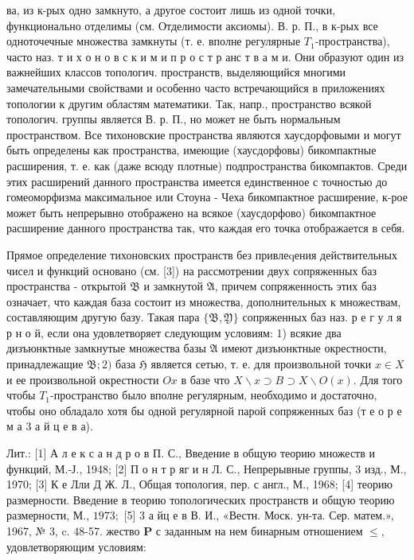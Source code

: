 \documentclass[10pt]{article}
\begin{document}
ва, из к-рых одно замкнуто, а другое состоит лишь из одной точки, функционально отделимы (см. Отделимости аксиомы). В. р. П., в к-рых все одноточечные множества замкнуты (т. е. вполне регулярные $T_{1}$-пространства), часто наз. т и х о н о в с к и м и п р о с т р анс т в а м и. Они образуют один из важнейших классов топологич. пространств, выделяющийся многими замечательными свойствами и особенно часто встречающийся в приложениях топологии к другим областям математики. Так, напр., пространство всякой топологич. группы является В. р. П., но может не быть нормальным пространством. Все тихоновские пространства являются хаусдорфовыми и могут быть определены как пространства, имеющие (хаусдорфовы) бикомпактные расширения, т. е. как (даже всюду плотные) подпространства бикомпактов. Среди этих расширений данного пространства имеется единственное с точностью до гомеоморфизма максимальное или Стоуна - Чеха бикомпактное расширение, к-рое может быть непрерывно отображено на всякое (хаусдорфово) бикомпактное расширение данного пространства так, что каждая его точка отображается в себя.



Прямое определение тихоновских пространств без привлеqения действительных чисел и функций основано (см. [3]) на рассмотрении двух сопряженных баз пространства - открытой $\mathfrak{B}$ и замкнутой $\mathfrak{A}$, причем сопряженность этих баз означает, что каждая база состоит из множества, дополнительных к множествам, составляющим другую базу. Такая пара $\{\mathfrak{B}, \mathfrak{Y}\}$ сопряженных баз наз. р е г у л я р н о й, если она удовлетворяет следующим условиям: 1) всякие два дизъюнктные замкнутые множества базы $\mathfrak{A}$ имеют дизъюнктные окрестности, принадлежащие $\mathfrak{B} ; 2)$ база $\mathfrak{H}$ является сетью, т. е. для произвольной точки $x \in X$ и ее произвольной окрестности $O x$ в базе что $X \backslash x \supset B \supset X \backslash O(x)$. Для того чтобы $T_{1}$-пространство было вполне регулярным, необходимо и достаточно, чтобы оно обладало хотя бы одной регулярной парой сопряженных баз (т е о р е м а 3 а й ц е в а).



Лит.: [1] А л е к с а н д р о в П. С., Введение в общую теорию множеств и функций, М.-Ј., 1948; [2] П о н т р яг и н Л. С., Непрерывные группы, 3 изд., М., 1970; [3] К е Лли Д Ж. Л., Общая топология, пер. с англ., М., 1968; [4] теорию размерности. Введение в теорию топологических пространств и общую теорию размерности, М., $1973 ;$ [5] 3 а йц е в В. И., «Вестн. Моск. ун-та. Сер. матем.», 1967, № 3, c. 48-57. жество $\boldsymbol{P}$ с заданным на нем бинарным отношением $\leqslant$, удовлетворяющим условиям:
\end{document}

